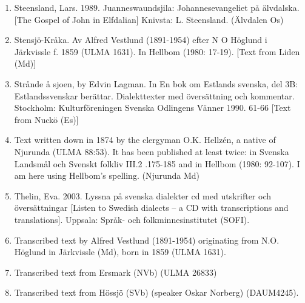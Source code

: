 \begin{enumerate}
\item 
\label{bkm:Ref150065761}Steensland, Lars. 1989. Juanneswaundsjila: Johannesevangeliet på älvdalska. [The Gospel of John in Elfdalian] Knivsta: L. Steensland. (Älvdalen Os)
\item 
\label{bkm:Ref154221412}\label{bkm:Ref154302630}Stensjö-Kråka. Av Alfred Vestlund (1891-1954) efter N O Höglund i Järkvissle f. 1859 (ULMA 1631). In Hellbom (1980: 17-19). [Text from Liden (Md)]
\item 
\label{bkm:Ref223343666}Strånde å sjoen, by Edvin Lagman. In En bok om Estlands svenska, del 3B: Estlandssvenskar berättar. Dialekttexter med översättning och kommentar. Stockholm: Kulturföreningen Svenska Odlingens Vänner 1990.  61-66 [Text from Nuckö (Es)]
\item 
Text written down in 1874 by the clergyman O.K. Hellzén, a native of Njurunda (ULMA 88:53). It has been published at least twice: in Svenska Landsmål och Svenskt folkliv III.2 .175-185 and in Hellbom (1980: 92-107). I am here using Hellbom’s spelling. (Njurunda Md)
\item 
Thelin, Eva. 2003. Lyssna på svenska dialekter cd med utskrifter och översättningar [Listen to Swedish dialects – a CD with transcriptions and translations]. Uppsala: Språk- och folkminnesinstitutet (SOFI).

\item 
Transcribed text by Alfred Vestlund (1891-1954) originating from N.O. Höglund in Järkvissle (Md), born in 1859 (ULMA 1631).

\item 
\label{bkm:Ref137880753}Transcribed text from Ersmark (NVb) (ULMA 26833) 

\item 
\label{bkm:Ref137882624}Transcribed text from Hössjö (SVb) (speaker Oskar Norberg) (DAUM4245).


\end{enumerate}
